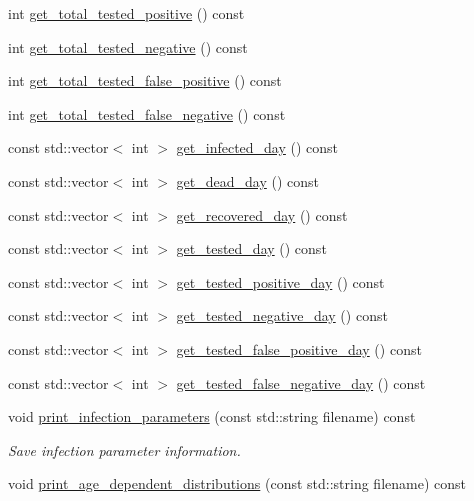 \begin{DoxyCompactItemize}
int \hyperlink{classABM_a2e4900dde8bc3287cff70bbd335fde8a}{get\+\_\+total\+\_\+tested\+\_\+positive} () const
\item 
int \hyperlink{classABM_a28b749db2b2d70f05c45f5327a95d4f7}{get\+\_\+total\+\_\+tested\+\_\+negative} () const
\item 
int \hyperlink{classABM_aa51a827c335bf4d7195883af88168367}{get\+\_\+total\+\_\+tested\+\_\+false\+\_\+positive} () const
\item 
int \hyperlink{classABM_a04318c25d252c8c4a94dfda962de35a4}{get\+\_\+total\+\_\+tested\+\_\+false\+\_\+negative} () const
\item 
const std\+::vector$<$ int $>$ \hyperlink{classABM_a21d391848b789516cf518abaff719bbc}{get\+\_\+infected\+\_\+day} () const
\item 
const std\+::vector$<$ int $>$ \hyperlink{classABM_aacf1095e585bcdeedbd637f1462fced9}{get\+\_\+dead\+\_\+day} () const
\item 
const std\+::vector$<$ int $>$ \hyperlink{classABM_af50856608f9c917c49e01ea86f4a6046}{get\+\_\+recovered\+\_\+day} () const
\item 
const std\+::vector$<$ int $>$ \hyperlink{classABM_ae2cf88fd41cb86336057e20206ac63c2}{get\+\_\+tested\+\_\+day} () const
\item 
const std\+::vector$<$ int $>$ \hyperlink{classABM_a4f716f9354ccd5be741d09d051c5364e}{get\+\_\+tested\+\_\+positive\+\_\+day} () const
\item 
const std\+::vector$<$ int $>$ \hyperlink{classABM_aa022bf85aeb80e7a454d2ed32b11badd}{get\+\_\+tested\+\_\+negative\+\_\+day} () const
\item 
const std\+::vector$<$ int $>$ \hyperlink{classABM_a245bef82eed1615d87588643115ae672}{get\+\_\+tested\+\_\+false\+\_\+positive\+\_\+day} () const
\item 
const std\+::vector$<$ int $>$ \hyperlink{classABM_a4bee67e458d0c13fa32bb1e4ffac01cf}{get\+\_\+tested\+\_\+false\+\_\+negative\+\_\+day} () const
\item 
void \hyperlink{classABM_a41144391129c6ba85305ccceff148e20}{print\+\_\+infection\+\_\+parameters} (const std\+::string filename) const
\begin{DoxyCompactList}\small\item\em Save infection parameter information. \end{DoxyCompactList}\item 
void \hyperlink{classABM_affafd1d079fd013bbef399fb7224f569}{print\+\_\+age\+\_\+dependent\+\_\+distributions} (const std\+::string filename) const

\end{DoxyCompactItemize}
